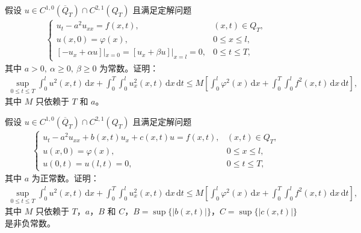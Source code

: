 \documentclass[../../main.tex]{subfiles}%
\begin{document}
\begin{example}
假设 $u\in C^{1,0}(\overline{Q}_T)\cap C^{2,1}(Q_T)$ 且满足定解问题
\begin{align*}
\begin{cases}
u_t-a^2u_{xx}=f(x,t), & (x,t)\in Q_T,\\
u(x,0)=\varphi(x), & 0\leqslant x\leqslant l,\\
[-u_x+\alpha u]|_{x=0}=[u_x+\beta u]|_{x=l}=0, & 0\leqslant t\leqslant T,
\end{cases}
\end{align*}
其中 $a>0,\ \alpha\geqslant 0,\ \beta\geqslant 0$ 为常数。证明：
\begin{align*}
\sup_{0\leqslant t\leqslant T}\int_0^l u^2(x,t)\,\mathrm{d}x+\int_0^T\int_0^l u_x^2(x,t)\,\mathrm{d}x\,\mathrm{d}t
\leqslant M\left[\int_0^l\varphi^2(x)\,\mathrm{d}x+\int_0^T\int_0^l f^2(x,t)\,\mathrm{d}x\,\mathrm{d}t\right],
\end{align*}
其中 $M$ 只依赖于 $T$ 和 $a$。
\end{example}

\begin{example}
假设 $u\in C^{1,0}(\overline{Q}_T)\cap C^{2,1}(Q_T)$ 且满足定解问题
\begin{align*}
\begin{cases}
u_t-a^2u_{xx}+b(x,t)u_x+c(x,t)u=f(x,t), & (x,t)\in Q_T,\\
u(x,0)=\varphi(x), & 0\leqslant x\leqslant l,\\
u(0,t)=u(l,t)=0, & 0\leqslant t\leqslant T,
\end{cases}
\end{align*}
其中 $a$ 为正常数。证明：
\begin{align*}
\sup_{0\leqslant t\leqslant T}\int_0^l u^2(x,t)\,\mathrm{d}x+\int_0^T\int_0^l u_x^2(x,t)\,\mathrm{d}x\,\mathrm{d}t
\leqslant M\left[\int_0^l\varphi^2(x)\,\mathrm{d}x+\int_0^T\int_0^l f^2(x,t)\,\mathrm{d}x\,\mathrm{d}t\right],
\end{align*}
其中 $M$ 只依赖于 $T$，$a$，$B$ 和 $C$，$B=\sup\{|b(x,t)|\}$，$C=\sup\{|c(x,t)|\}$ 是非负常数。
\end{example}
\end{document}
